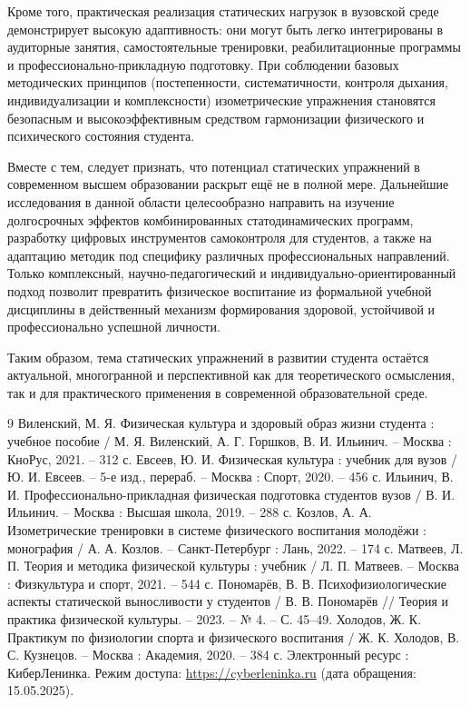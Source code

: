 \documentclass[oneside,a4paper,14pt]{extarticle}
\begin{document}
Кроме того, практическая реализация статических нагрузок в вузовской среде демонстрирует высокую адаптивность: они могут быть легко интегрированы в аудиторные занятия, самостоятельные тренировки, реабилитационные программы и профессионально-прикладную подготовку. При соблюдении базовых методических принципов (постепенности, систематичности, контроля дыхания, индивидуализации и комплексности) изометрические упражнения становятся безопасным и высокоэффективным средством гармонизации физического и психического состояния студента.

Вместе с тем, следует признать, что потенциал статических упражнений в современном высшем образовании раскрыт ещё не в полной мере. Дальнейшие исследования в данной области целесообразно направить на изучение долгосрочных эффектов комбинированных статодинамических программ, разработку цифровых инструментов самоконтроля для студентов, а также на адаптацию методик под специфику различных профессиональных направлений. Только комплексный, научно-педагогический и индивидуально-ориентированный подход позволит превратить физическое воспитание из формальной учебной дисциплины в действенный механизм формирования здоровой, устойчивой и профессионально успешной личности.

Таким образом, тема статических упражнений в развитии студента остаётся актуальной, многогранной и перспективной как для теоретического осмысления, так и для практического применения в современной образовательной среде.

\begin{thebibliography}{9}
 Виленский, М. Я. Физическая культура и здоровый образ жизни студента : учебное пособие / М. Я. Виленский, А. Г. Горшков, В. И. Ильинич. -- Москва : КноРус, 2021. -- 312 с.
 Евсеев, Ю. И. Физическая культура : учебник для вузов / Ю. И. Евсеев. -- 5-е изд., перераб. -- Москва : Спорт, 2020. -- 456 с.
 Ильинич, В. И. Профессионально-прикладная физическая подготовка студентов вузов / В. И. Ильинич. -- Москва : Высшая школа, 2019. -- 288 с.
 Козлов, А. А. Изометрические тренировки в системе физического воспитания молодёжи : монография / А. А. Козлов. -- Санкт-Петербург : Лань, 2022. -- 174 с.
 Матвеев, Л. П. Теория и методика физической культуры : учебник / Л. П. Матвеев. -- Москва : Физкультура и спорт, 2021. -- 544 с.
 Пономарёв, В. В. Психофизиологические аспекты статической выносливости у студентов / В. В. Пономарёв // Теория и практика физической культуры. -- 2023. -- № 4. -- С. 45--49.
 Холодов, Ж. К. Практикум по физиологии спорта и физического воспитания / Ж. К. Холодов, В. С. Кузнецов. -- Москва : Академия, 2020. -- 384 с.
 Электронный ресурс : КиберЛенинка. Режим доступа: \url{https://cyberleninka.ru} (дата обращения: 15.05.2025).
\end{thebibliography}
\end{document}
